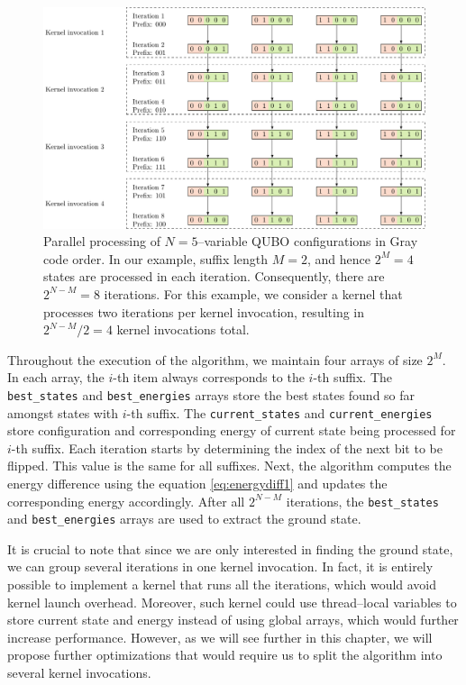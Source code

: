 \begin{figure}
  \includegraphics[width=\textwidth]{figures/grayparallel}
  \caption{
    Parallel processing of $N=5$--variable QUBO configurations in Gray code order.
    In our example, suffix length $M=2$, and hence $2^{M}=4$ states are processed
        in each iteration. Consequently, there are $2^{N-M}=8$ iterations. For this
        example, we consider a kernel that processes two iterations per kernel
        invocation, resulting in $2^{N-M}/2 = 4$ kernel invocations total. }
  \label{fig:grayparallel}
\end{figure}

Throughout the execution of the algorithm, we maintain four arrays of size
$2^{M}$. In each array, the $i$-th item always corresponds to the $i$-th
suffix. The \texttt{best\_states} and \texttt{best\_energies} arrays store the
best states found so far amongst states with $i$-th suffix. The
\texttt{current\_states} and \texttt{current\_energies} store configuration and
corresponding energy of current state being processed for $i$-th suffix. Each
iteration starts by determining the index of the next bit to be flipped. This
value is the same for all suffixes. Next, the algorithm computes the energy
difference using the equation \ref{eq:energydiff1} and updates the
corresponding energy accordingly. After all $2^{N-M}$ iterations, the
\texttt{best\_states} and \texttt{best\_energies} arrays are used to extract
the ground state.

It is crucial to note that since we are only interested in finding the ground
state, we can group several iterations in one kernel invocation. In fact, it is
entirely possible to implement a kernel that runs all the iterations, which
would avoid kernel launch overhead. Moreover, such kernel could use
thread--local variables to store current state and energy instead of using
global arrays, which would further increase performance. However, as we will
see further in this chapter, we will propose further optimizations that would
require us to split the algorithm into several kernel invocations.

